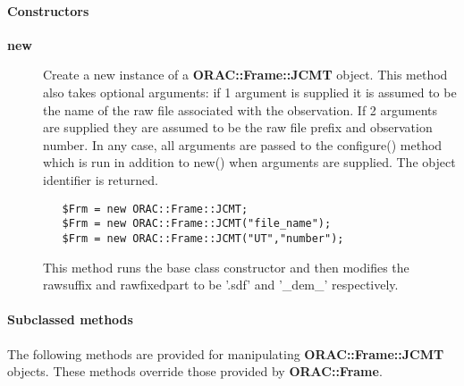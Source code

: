 \paragraph*{Constructors\label{ORAC::Frame::JCMT_Constructors}}
\begin{description}

\item[\textbf{new}] \mbox{}

Create a new instance of a \textbf{ORAC::Frame::JCMT} object.
This method also takes optional arguments:
if 1 argument is  supplied it is assumed to be the name
of the raw file associated with the observation. If 2 arguments
are supplied they are assumed to be the raw file prefix and
observation number. In any case, all arguments are passed to
the configure() method which is run in addition to new()
when arguments are supplied.
The object identifier is returned.

\begin{verbatim}
   $Frm = new ORAC::Frame::JCMT;
   $Frm = new ORAC::Frame::JCMT("file_name");
   $Frm = new ORAC::Frame::JCMT("UT","number");
\end{verbatim}


This method runs the base class constructor and then modifies
the rawsuffix and rawfixedpart to be '.sdf' and '\_dem\_'
respectively.

\end{description}
\paragraph*{Subclassed methods\label{ORAC::Frame::JCMT_Subclassed_methods}}


The following methods are provided for manipulating
\textbf{ORAC::Frame::JCMT} objects. These methods override those
provided by \textbf{ORAC::Frame}.

